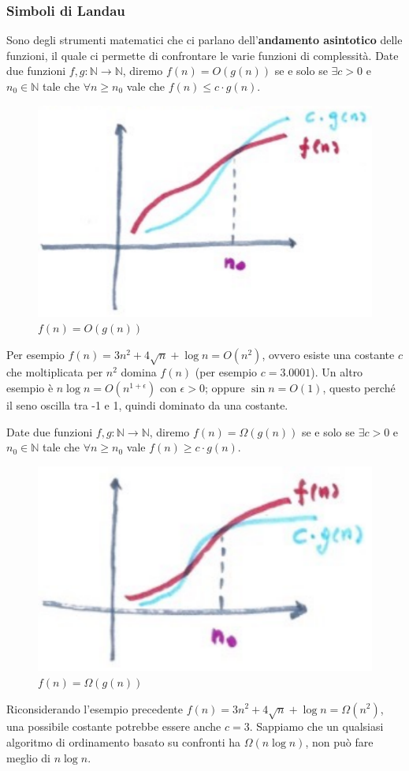 \documentclass{article}
\begin{document}
\subsubsection{Simboli di Landau}
Sono degli strumenti matematici che ci parlano dell'\textbf{andamento asintotico} delle funzioni, il
quale ci permette di confrontare le varie funzioni di complessità. Date due funzioni $f,g:\mathbb{N}\rightarrow\mathbb{N}$,
diremo $f(n)=O(g(n))$ se e solo se $\exists c>0$ e $n_0\in\mathbb{N}$ tale che $\forall n\geq n_0$
vale che $f(n)\leq c\cdot g(n)$.
\begin{figure}[H]
    \centering
    \includegraphics[scale=0.4]{images/ogrande.png}
    \caption{$f(n)=O(g(n))$}
\end{figure}
Per esempio $f(n)=3n^2+4\sqrt{n}+\log n=O(n^2)$, ovvero esiste una costante $c$ che moltiplicata
per $n^2$ domina $f(n)$ (per esempio $c=3.0001$). Un altro esempio è $n\log n=O(n^{1+\epsilon})$
con $\epsilon>0$; oppure $\sin n = O(1)$, questo perché il seno oscilla tra -1 e 1,
quindi dominato da una costante.

Date due funzioni $f,g:\mathbb{N}\rightarrow\mathbb{N}$, diremo $f(n)=\Omega(g(n))$ se e solo
se $\exists c>0$ e $n_0\in\mathbb{N}$ tale che $\forall n\geq n_0$ vale $f(n)\geq c\cdot g(n)$.
\begin{figure}[H]
    \centering
    \includegraphics[scale=0.4]{images/omegagrande.png}
    \caption{$f(n)=\Omega (g(n))$}
\end{figure}
Riconsiderando l'esempio precedente $f(n)=3n^2+4\sqrt{n}+\log n=\Omega(n^2)$, una possibile
costante potrebbe essere anche $c=3$. Sappiamo che un qualsiasi algoritmo di ordinamento
basato su confronti ha $\Omega (n\log n)$, non può fare meglio di $n\log n$.
\end{document}
